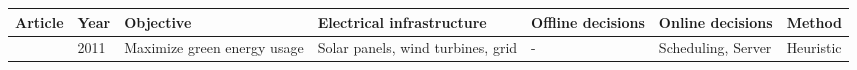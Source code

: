 \begin{landscape}

\begin{table*}[htp]
\centering
\begin{tabular}{m{3cm}|m{1cm}|m{3cm}|m{3cm}|m{3cm}|m{3cm}|m{3cm}}
\hline
Article & Year & Objective & Electrical infrastructure & Offline decisions & Online decisions & Method \\ \hline\hline
\citeauthor{aksanli2011utilizing} \cite{aksanli2011utilizing} & 2011 & Maximize green energy usage & Solar panels, wind turbines, grid & - & Scheduling, Server & Heuristic \\ \hline
\end{tabular}
\end{table*}

\end{landscape}

